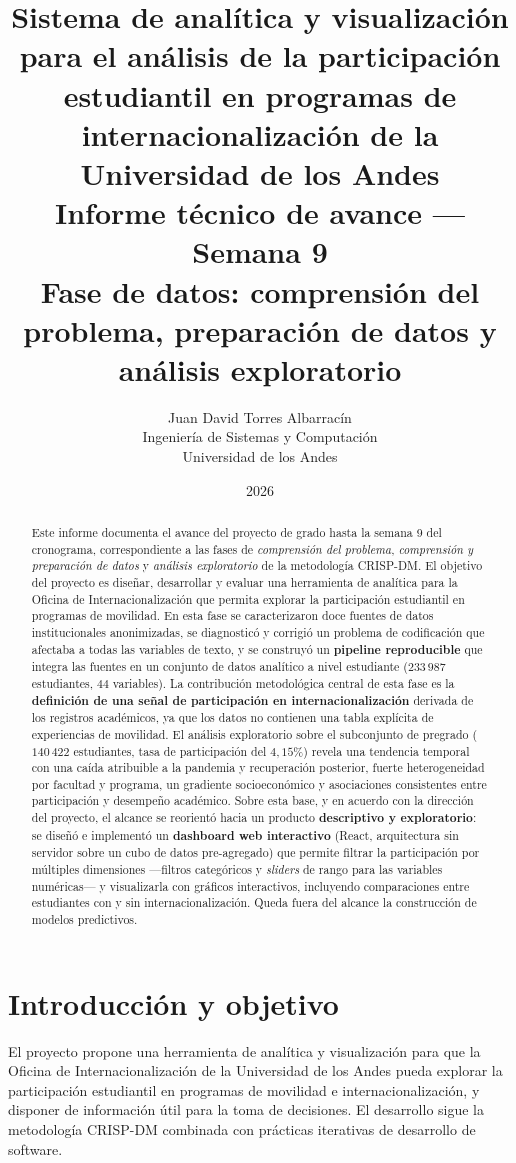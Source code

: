 \documentclass[12pt,a4paper]{article}
\title{
    \textbf{Sistema de analítica y visualización para el análisis de la participación
    estudiantil en programas de internacionalización de la Universidad de los Andes}\\[0.4em]
    \large Informe técnico de avance --- Semana 9\\
    \normalsize Fase de datos: comprensión del problema, preparación de datos y análisis exploratorio
}
\author{
    Juan David Torres Albarracín\\
    Ingeniería de Sistemas y Computación\\
    Universidad de los Andes
}
\date{2026}
\begin{document}
\maketitle

\begin{abstract}
\noindent
Este informe documenta el avance del proyecto de grado hasta la semana 9 del
cronograma, correspondiente a las fases de \emph{comprensión del problema},
\emph{comprensión y preparación de datos} y \emph{análisis exploratorio} de la
metodología CRISP-DM. El objetivo del proyecto es diseñar, desarrollar y evaluar
una herramienta de analítica para la Oficina de Internacionalización que permita
explorar la participación estudiantil en programas de movilidad. En esta fase se
caracterizaron doce fuentes de datos institucionales anonimizadas, se diagnosticó
y corrigió un problema de codificación que afectaba a todas las variables de
texto, y se construyó un \textbf{pipeline reproducible} que integra las fuentes en
un conjunto de datos analítico a nivel estudiante ($233\,987$ estudiantes,
$44$ variables). La contribución metodológica central de esta fase es la
\textbf{definición de una señal de participación en internacionalización} derivada
de los registros académicos, ya que los datos no contienen una tabla explícita de
experiencias de movilidad. El análisis exploratorio sobre el subconjunto de
pregrado ($140\,422$ estudiantes, tasa de participación del $4{,}15\%$) revela una
tendencia temporal con una caída atribuible a la pandemia y recuperación
posterior, fuerte heterogeneidad por facultad y programa, un gradiente
socioeconómico y asociaciones consistentes entre participación y desempeño
académico. Sobre esta base, y en acuerdo con la dirección del proyecto, el alcance
se reorientó hacia un producto \textbf{descriptivo y exploratorio}: se diseñó e
implementó un \textbf{dashboard web interactivo} (React, arquitectura sin servidor
sobre un cubo de datos pre-agregado) que permite filtrar la participación por
múltiples dimensiones ---filtros categóricos y \emph{sliders} de rango para las
variables numéricas--- y visualizarla con gráficos interactivos, incluyendo
comparaciones entre estudiantes con y sin internacionalización. Queda fuera del
alcance la construcción de modelos predictivos.
\end{abstract}

\tableofcontents
\newpage

\section{Introducción y objetivo}
El proyecto propone una herramienta de analítica y visualización para que la
Oficina de Internacionalización de la Universidad de los Andes pueda explorar la
participación estudiantil en programas de movilidad e internacionalización, y
disponer de información útil para la toma de decisiones. El desarrollo sigue la
metodología CRISP-DM \cite{wirth2000,chapman2000} combinada con prácticas
iterativas de desarrollo de software.
\end{document}
